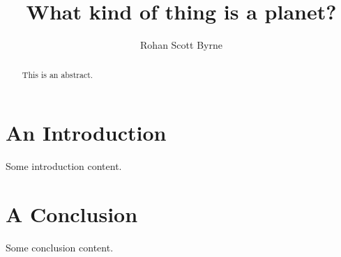 \documentclass{article}
\title{What kind of thing is a planet?}
\author[]{Rohan Scott Byrne}
\begin{document}
\maketitle

\begin{abstract}
This is an abstract.\\
\end{abstract}


\vspace{0.35cm}




\section{An Introduction}

Some introduction content.

\section{A Conclusion}

Some conclusion content.
\end{document}
